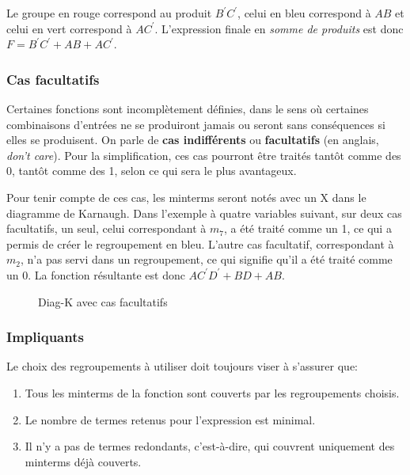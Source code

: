 \documentclass[11pt]{article}
\begin{document}
Le groupe en rouge correspond au produit \(B^\prime C^\prime\), celui
en bleu correspond à \(A B\) et celui en vert correspond à \(A
C^\prime\). L'expression finale en \emph{somme de produits} est donc \(F =
B^\prime C^\prime + A B + A C^\prime\).

\subsubsection{Cas facultatifs}
\label{sec:org0e4fe1b}

Certaines fonctions sont incomplètement définies, dans le sens où
certaines combinaisons d'entrées ne se produiront jamais ou seront
sans conséquences si elles se produisent. On parle de \textbf{cas
indifférents} ou \textbf{facultatifs} (en anglais, \emph{don't care}). Pour la
simplification, ces cas pourront être traités tantôt comme des 0,
tantôt comme des 1, selon ce qui sera le plus avantageux.

Pour tenir compte de ces cas, les minterms seront notés avec un X dans
le diagramme de Karnaugh. Dans l'exemple à quatre variables suivant,
sur deux cas facultatifs, un seul, celui correspondant à \(m_{7}\), a
été traité comme un 1, ce qui a permis de créer le regroupement en
bleu. L'autre cas facultatif, correspondant à \(m_{2}\), n'a pas servi
dans un regroupement, ce qui signifie qu'il a été traité comme
un 0. La fonction résultante est donc \(A C^\prime D^\prime + BD + AB\).

\begin{figure}[htbp]
\centering

\caption{\label{fig:org4f22dcf}Diag-K avec cas facultatifs}
\end{figure}


\subsubsection{Impliquants}
\label{sec:orgc1e63d2}

Le choix des regroupements à utiliser doit toujours viser à s'assurer que:
\begin{enumerate}
\item Tous les minterms de la fonction sont couverts par les regroupements choisis.
\item Le nombre de termes retenus pour l'expression est minimal.
\item Il n'y a pas de termes redondants, c'est-à-dire, qui couvrent
uniquement des minterms déjà couverts.
\end{enumerate}
\end{document}
